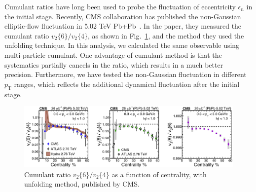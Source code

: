 Cumulant ratios have long been used to probe the fluctuation of eccentricity $\epsilon_n$ in the initial stage. Recently, CMS collaboration has published the non-Gaussian elliptic-flow fluctuation in 5.02 TeV Pb+Pb~\cite{Sirunyan:2017fts}. In the paper, they measured the cumulant ratio $v_2\{6\}/v_2\{4\}$, as shown in Fig.~\ref{fig:result_cr_CMS}, and the method they used the unfolding technique. In this analysis, we calculated the same observable using multi-particle cumulant. One advantage of cumulant method is that the systematics partially cancels in the ratio, which results in a much better precision. Furthermore, we have tested the non-Gaussian fluctuation in different $p_\text{T}$ ranges, which reflects the additional dynamical fluctuation after the initial stage.
\begin{figure}[H]
\centering
\includegraphics[width=.9\linewidth]{figs/sec_result/cr_CMS.png}
\caption{Cumulant ratio $v_2\{6\}/v_2\{4\}$ as a function of centrality, with unfolding method, published by CMS.}
\label{fig:result_cr_CMS}
\end{figure}







